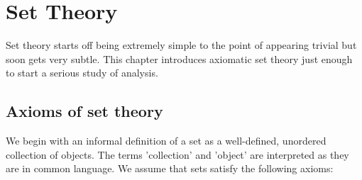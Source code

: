 \chapter{Set Theory}\label{c2}

Set theory starts off being extremely simple to the point of appearing
trivial but soon gets very subtle. This chapter introduces axiomatic set
theory just enough to start a serious study of analysis. 

\section{Axioms of set theory}\label{c2s1}
We begin with an informal definition of a set as a well-defined, unordered
collection of objects. The terms 'collection' and 'object' are interpreted
as they are in common language. We assume that sets satisfy the following
axioms:
